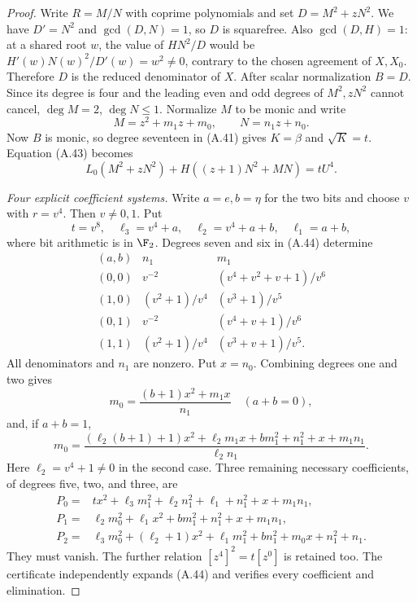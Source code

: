 \begin{proof}
Write $R=M/N$ with coprime polynomials and set
$D=M^2+zN^2$. We have $D'=N^2$ and $\gcd(D,N)=1$,
so $D$ is squarefree. Also $\gcd(D,H)=1$: at a shared
root $w$, the value of $HN^2/D$ would be
$H'(w)N(w)^2/D'(w)=w^2\ne0$, contrary to the chosen
agreement of $X,X_0$. Therefore $D$ is the reduced
denominator of $X$. After scalar normalization $B=D$.
Since its degree is four and the leading even and odd
degrees of $M^2,zN^2$ cannot cancel, $\deg M=2$,
$\deg N\le1$. Normalize $M$ to be monic and write
\[
 M=z^2+m_1z+m_0,\qquad N=n_1z+n_0.
\]
Now $B$ is monic, so degree seventeen in (A.41) gives
$K=\beta$ and $\sqrt K=t$. Equation (A.43) becomes
\[
 L_0(M^2+zN^2)+H((z+1)N^2+MN)=tU^4.                    \tag{A.44}
\]

\emph{Four explicit coefficient systems.}
Write $a=e,b=\eta$ for the two bits and choose $v$
with $r=v^4$. Then $v\ne0,1$. Put
\[
 t=v^8,\quad\ell_3=v^4+a,\quad
 \ell_2=v^4+a+b,\quad\ell_1=a+b,
\]
where bit arithmetic is in $\F_2$. Degrees seven and
six in (A.44) determine
\[
\begin{array}{c|c|c}
(a,b)&n_1&m_1\\\hline
(0,0)&v^{-2}&(v^4+v^2+v+1)/v^6\\
(1,0)&(v^2+1)/v^4&(v^3+1)/v^5\\
(0,1)&v^{-2}&(v^4+v+1)/v^6\\
(1,1)&(v^2+1)/v^4&(v^3+v+1)/v^5 .
\end{array}
\]
All denominators and $n_1$ are nonzero. Put $x=n_0$.
Combining degrees one and two gives
\[
 m_0=\frac{(b+1)x^2+m_1x}{n_1}\quad(a+b=0),
\]
and, if $a+b=1$,
\[
 m_0=\frac{(\ell_2(b+1)+1)x^2+\ell_2m_1x+
                 bm_1^2+n_1^2+x+m_1n_1}{\ell_2n_1}.
\]
Here $\ell_2=v^4+1\ne0$ in the second case. Three
remaining necessary coefficients, of degrees five,
two, and three, are
\[
\begin{aligned}
P_0={}&tx^2+\ell_3m_1^2+\ell_2n_1^2+
                             \ell_1+n_1^2+x+m_1n_1,\\
P_1={}&\ell_2m_0^2+\ell_1x^2+bm_1^2+
                                           n_1^2+x+m_1n_1,\\
P_2={}&\ell_3m_0^2+(\ell_2+1)x^2+\ell_1m_1^2+
                                  bn_1^2+m_0x+n_1^2+n_1.
\end{aligned}                                                     \tag{A.45}
\]
They must vanish. The further relation $[z^4]^2=t[z^0]$
is retained too. The certificate independently expands
(A.44) and verifies every coefficient and elimination.


\end{proof}
